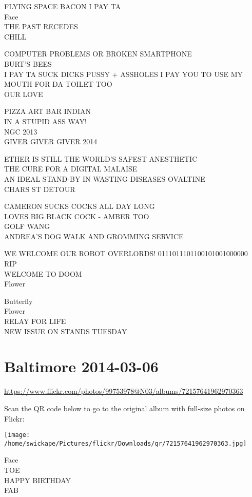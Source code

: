 \documentclass[10pt,letterpaper]{article}
\begin{document}
FLYING SPACE BACON I PAY TA\\
Face\\
THE PAST RECEDES\\
CHILL

COMPUTER PROBLEMS OR BROKEN SMARTPHONE\\
BURT'S BEES\\
I PAY TA SUCK DICKS PUSSY + ASSHOLES I PAY YOU TO USE MY MOUTH FOR DA TOILET TOO\\
OUR LOVE

PIZZA ART BAR INDIAN\\
IN A STUPID ASS WAY!\\
NGC 2013\\
GIVER GIVER GIVER 2014

ETHER IS STILL THE WORLD'S SAFEST ANESTHETIC\\
THE CURE FOR A DIGITAL MALAISE\\
AN IDEAL STAND{-}BY IN WASTING DISEASES OVALTINE\\
CHARS ST DETOUR

CAMERON SUCKS COCKS ALL DAY LONG\\
LOVES BIG BLACK COCK {-} AMBER TOO\\
GOLF WANG\\
ANDREA'S DOG WALK AND GROMMING SERVICE

WE WELCOME OUR ROBOT OVERLORDS!  0111011101100101001000000\\
RIP\\
WELCOME TO DOOM\\
Flower

Butterfly\\
Flower\\
RELAY FOR LIFE\\
NEW ISSUE ON STANDS TUESDAY


\section*{Baltimore 2014-03-06}

\url{https://www.flickr.com/photos/99753978@N03/albums/72157641962970363}

Scan the QR code below to go to the original album with full-size photos on Flickr:

\texttt{[image: /home/swickape/Pictures/flickr/Downloads/qr/72157641962970363.jpg]}


Face\\
TOE\\
HAPPY BIRTHDAY\\
FAB
\end{document}
